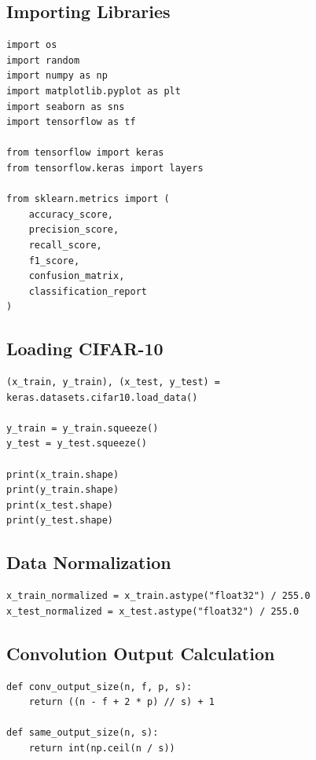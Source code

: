 \documentclass[11pt]{article}
\begin{document}
\subsection{Importing Libraries}
\begin{lstlisting}
import os
import random
import numpy as np
import matplotlib.pyplot as plt
import seaborn as sns
import tensorflow as tf

from tensorflow import keras
from tensorflow.keras import layers

from sklearn.metrics import (
    accuracy_score,
    precision_score,
    recall_score,
    f1_score,
    confusion_matrix,
    classification_report
)
\end{lstlisting}

\subsection{Loading CIFAR-10}
\begin{lstlisting}
(x_train, y_train), (x_test, y_test) = keras.datasets.cifar10.load_data()

y_train = y_train.squeeze()
y_test = y_test.squeeze()

print(x_train.shape)
print(y_train.shape)
print(x_test.shape)
print(y_test.shape)
\end{lstlisting}

\subsection{Data Normalization}
\begin{lstlisting}
x_train_normalized = x_train.astype("float32") / 255.0
x_test_normalized = x_test.astype("float32") / 255.0
\end{lstlisting}

\subsection{Convolution Output Calculation}
\begin{lstlisting}
def conv_output_size(n, f, p, s):
    return ((n - f + 2 * p) // s) + 1

def same_output_size(n, s):
    return int(np.ceil(n / s))
\end{lstlisting}
\end{document}
